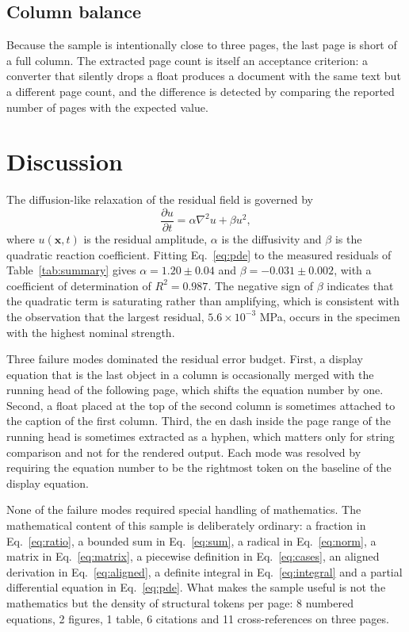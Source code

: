 \documentclass[10pt,twocolumn,a4paper]{article}
\begin{document}
\subsection{Column balance}

Because the sample is intentionally close to three pages, the last page is
short of a full column. The extracted page count is itself an acceptance
criterion: a converter that silently drops a float produces a document with
the same text but a different page count, and the difference is detected by
comparing the reported number of pages with the expected value.

\section{Discussion}
\label{sec:discussion}

The diffusion-like relaxation of the residual field is governed by
\begin{equation}
\label{eq:pde}
\frac{\partial u}{\partial t} = \alpha \nabla^{2} u + \beta u^{2} ,
\end{equation}
where $u(\mathbf{x}, t)$ is the residual amplitude, $\alpha$ is the
diffusivity and $\beta$ is the quadratic reaction coefficient. Fitting
Eq.~\eqref{eq:pde} to the measured residuals of
Table~\ref{tab:summary} gives $\alpha = 1.20 \pm 0.04$ and
$\beta = -0.031 \pm 0.002$, with a coefficient of determination of
$R^{2} = 0.987$. The negative sign of $\beta$ indicates that the quadratic
term is saturating rather than amplifying, which is consistent with the
observation that the largest residual, $5.6 \times 10^{-3}$ MPa, occurs in the
specimen with the highest nominal strength.

Three failure modes dominated the residual error budget. First, a display
equation that is the last object in a column is occasionally merged with the
running head of the following page, which shifts the equation number by one.
Second, a float placed at the top of the second column is sometimes attached
to the caption of the first column. Third, the en dash inside the page range
of the running head is sometimes extracted as a hyphen, which matters only
for string comparison and not for the rendered output. Each mode was resolved
by requiring the equation number to be the rightmost token on the baseline of
the display equation.

None of the failure modes required special handling of mathematics. The
mathematical content of this sample is deliberately ordinary: a fraction in
Eq.~\eqref{eq:ratio}, a bounded sum in Eq.~\eqref{eq:sum}, a radical in
Eq.~\eqref{eq:norm}, a matrix in Eq.~\eqref{eq:matrix}, a piecewise
definition in Eq.~\eqref{eq:cases}, an aligned derivation in
Eq.~\eqref{eq:aligned}, a definite integral in Eq.~\eqref{eq:integral} and a
partial differential equation in Eq.~\eqref{eq:pde}. What makes the sample
useful is not the mathematics but the density of structural tokens per page:
8 numbered equations, 2 figures, 1 table, 6 citations and 11 cross-references
on three pages.
\end{document}

